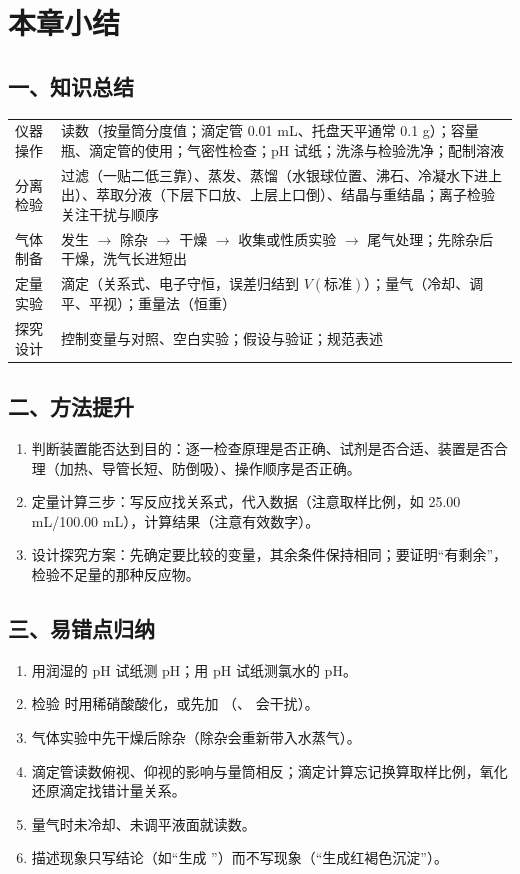 \documentclass[UTF8,a4paper,zihao=5,oneside,openany,fontset=none]{ctexbook}
\newcommand{\zhangmo}[1]{\par\Needspace{6\baselineskip}\section*{#1}\addcontentsline{toc}{section}{#1}}
\begin{document}
\zhangmo{本章小结}
\subsection*{一、知识总结}
\begin{center}
\small
\begin{tabularx}{\linewidth}{p{2.2cm}X}
\toprule
仪器操作 & 读数（按量筒分度值；滴定管 0.01 mL、托盘天平通常 0.1 g）；容量瓶、滴定管的使用；气密性检查；pH 试纸；洗涤与检验洗净；配制溶液 \\
分离检验 & 过滤（一贴二低三靠）、蒸发、蒸馏（水银球位置、沸石、冷凝水下进上出）、萃取分液（下层下口放、上层上口倒）、结晶与重结晶；离子检验关注干扰与顺序 \\
气体制备 & 发生 $\to$ 除杂 $\to$ 干燥 $\to$ 收集或性质实验 $\to$ 尾气处理；先除杂后干燥，洗气长进短出 \\
定量实验 & 滴定（关系式、电子守恒，误差归结到 $V(\text{标准})$）；量气（冷却、调平、平视）；重量法（恒重） \\
探究设计 & 控制变量与对照、空白实验；假设与验证；规范表述 \\
\bottomrule
\end{tabularx}
\end{center}
\subsection*{二、方法提升}
\begin{enumerate}
\item 判断装置能否达到目的：逐一检查原理是否正确、试剂是否合适、装置是否合理（加热、导管长短、防倒吸）、操作顺序是否正确。
\item 定量计算三步：写反应找关系式，代入数据（注意取样比例，如 25.00 mL/100.00 mL），计算结果（注意有效数字）。
\item 设计探究方案：先确定要比较的变量，其余条件保持相同；要证明“有剩余”，检验不足量的那种反应物。
\end{enumerate}
\subsection*{三、易错点归纳}
\begin{enumerate}
\item 用润湿的 pH 试纸测 pH；用 pH 试纸测氯水的 pH。
\item 检验  时用稀硝酸酸化，或先加 （、 会干扰）。
\item 气体实验中先干燥后除杂（除杂会重新带入水蒸气）。
\item 滴定管读数俯视、仰视的影响与量筒相反；滴定计算忘记换算取样比例，氧化还原滴定找错计量关系。
\item 量气时未冷却、未调平液面就读数。
\item 描述现象只写结论（如“生成 ”）而不写现象（“生成红褐色沉淀”）。
\end{enumerate}
\end{document}
